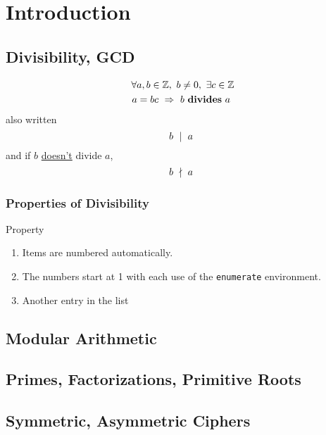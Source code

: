 \chapter{Introduction}

\section{Divisibility, GCD}


\begin{definition}[Divisibility]
\begin{gather*}
    \forall a,b \in \mathbb{Z}, \ b \ne 0,\ \exists c\in \mathbb{Z} \\  a=bc \ \Rightarrow \  b \ \textbf{divides} \ a \ 
\end{gather*}
also written \[b \ \mid \ a \ \]
and if $b$ \underline{doesn't} divide $a$, \[b \ \nmid \ a \ \]
\end{definition}

\subsection{Properties of Divisibility}

Property 

\begin{enumerate}
  \item Items are numbered automatically.
  \item The numbers start at 1 with each use of the \texttt{enumerate} environment.
  \item Another entry in the list
\end{enumerate}

\section{Modular Arithmetic}
\section{Primes, Factorizations, Primitive Roots}
\section{Symmetric, Asymmetric Ciphers}